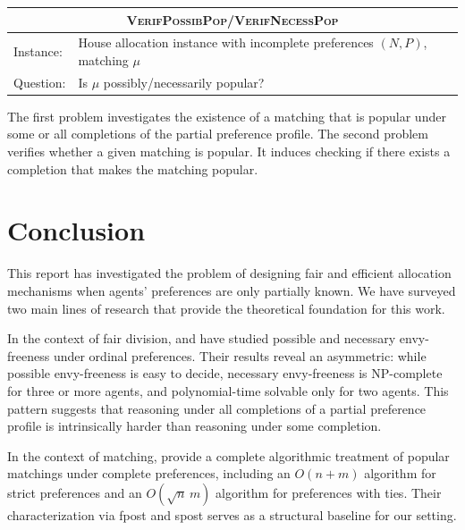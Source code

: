 \documentclass{article}
\newcommand{\match}{\mu}
\begin{document}
\smallbreak
\begin{tabular}{ll}
\toprule
\multicolumn{2}{c}{\textsc{VerifPossibPop}/\textsc{VerifNecessPop}} \\
\midrule
Instance: & House allocation instance with incomplete preferences $(N,P)$, matching $\match$ \\
Question: & Is $\match$ possibly/necessarily popular? \\
\bottomrule
\end{tabular}


The first problem investigates the existence of a matching that is popular under some or all completions of the partial preference profile.
The second problem verifies whether a given matching is popular. It induces checking if there exists a completion that makes the matching popular.

\section{Conclusion}


This report has investigated the problem of designing fair and efficient allocation mechanisms when agents' preferences are only partially known. 
We have surveyed two main lines of research that provide the theoretical foundation for this work.

In the context of fair division, \cite{bouveret2010fair} and \cite{aziz2024computational} have studied possible and necessary envy-freeness under ordinal preferences. 
Their results reveal an asymmetric: while possible envy-freeness is easy to decide, necessary envy-freeness is NP-complete for three or more agents, and polynomial-time solvable only for two agents. 
This pattern suggests that reasoning under all completions of a partial preference profile is intrinsically harder than reasoning under some completion.

In the context of matching, \cite{abraham2007popular} provide a complete algorithmic treatment of popular matchings under complete preferences, including an $O(n+m)$ algorithm for strict preferences and an $O(\sqrt{n}\,m)$ algorithm for preferences with ties. 
Their characterization via fpost and spost serves as a structural baseline for our setting.
\end{document}
